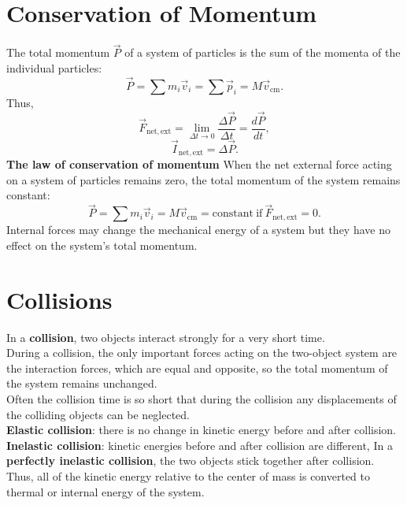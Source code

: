 \documentclass[11pt,a4paper]{report}
\begin{document}
\section{Conservation of Momentum}
The total momentum $\vec{P}$ of a system of particles is the sum of the momenta of the individual particles: $$\vec{P} = \sum m_i \vec{v}_i = \sum \vec{p}_i = M \vec{v}_\mathrm{cm}.$$
Thus, $$\vec{F}_\mathrm{net, ext} = \lim_{\Delta{t} \to 0}{\frac{\Delta{\vec{P}}}{\Delta{t}}} = \frac{d\vec{P}}{dt},$$ $$\vec{I}_\mathrm{net, ext} = \Delta{\vec{P}}.$$
\textbf{The law of conservation of momentum} When the net external force acting on a system of particles remains zero, the total momentum of the system remains constant: $$\vec{P} = \sum m_i \vec{v}_i = M \vec{v}_\mathrm{cm} = \mathrm{constant\ if\ } \vec{F}_\mathrm{net, ext} = 0.$$
Internal forces may change the mechanical energy of a system but they have no effect on the system's total momentum.

%
%

\section{Collisions}
In a \textbf{collision}, two objects interact strongly for a very short time.
\\During a collision, the only important forces acting on the two-object system are the interaction forces, which are equal and opposite, so the total momentum of the system remains unchanged.
\\Often the collision time is so short that during the collision any displacements of the colliding objects can be neglected.
\\\textbf{Elastic collision}: there is no change in kinetic energy before and after collision.
\\\textbf{Inelastic collision}: kinetic energies before and after collision are different, In a \textbf{perfectly inelastic collision}, the two objects stick together after collision. Thus, all of the kinetic energy relative to the center of mass is converted to thermal or internal energy of the system.
\end{document}
